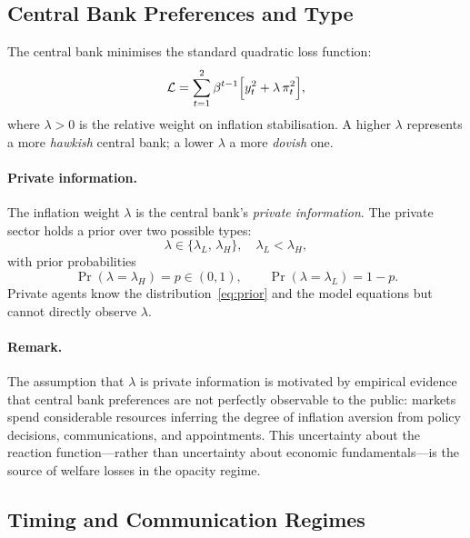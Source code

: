 \subsection{Central Bank Preferences and Type}
\label{sec:CB_prefs}

The central bank minimises the standard quadratic loss function:
\begin{equation}
  \mathcal{L} = \sum_{t=1}^{2} \beta^{t-1}
    \Bigl[ y_t^2 + \lambda\,\pi_t^2 \Bigr],
  \label{eq:loss}
\end{equation}
where $\lambda > 0$ is the relative weight on inflation stabilisation. A higher
$\lambda$ represents a more \emph{hawkish} central bank; a lower $\lambda$ a more
\emph{dovish} one.

\paragraph{Private information.}
The inflation weight $\lambda$ is the central bank's \emph{private information}. The
private sector holds a prior over two possible types:
\begin{equation}
  \lambda \in \{\lambda_L,\, \lambda_H\}, \quad \lambda_L < \lambda_H,
  \label{eq:types}
\end{equation}
with prior probabilities
\begin{equation}
  \Pr(\lambda = \lambda_H) = p \in (0,1), \qquad
  \Pr(\lambda = \lambda_L) = 1-p.
  \label{eq:prior}
\end{equation}
Private agents know the distribution~\eqref{eq:prior} and the model equations but
cannot directly observe $\lambda$.

\paragraph{Remark.}
The assumption that $\lambda$ is private information is motivated by empirical evidence
that central bank preferences are not perfectly observable to the public: markets spend
considerable resources inferring the degree of inflation aversion from policy
decisions, communications, and appointments. This uncertainty about the reaction
function---rather than uncertainty about economic fundamentals---is the source of
welfare losses in the opacity regime.

\subsection{Timing and Communication Regimes}
\label{sec:timing}

